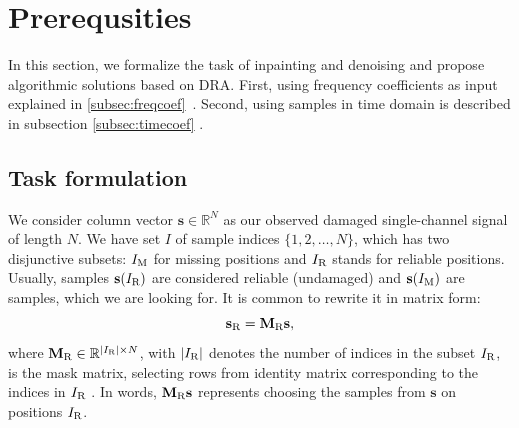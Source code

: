 \documentclass[conference]{IEEEtran}
\newcommand{\todo}[1]{\textcolor{red}{#1}}
\begin{document}
\section{Prerequsities}\label{sec:prereq} 


In this section, we formalize the task of inpainting and denoising and propose algorithmic solutions based on DRA.
First, using frequency coefficients as input explained in \ref{subsec:freqcoef}~\cite{Mokry2020}.
Second, using samples in time domain is described in subsection \ref{subsec:timecoef} \cite{Mokry2021}.


\subsection{Task formulation}

We consider column vector $ \mathbf{s} \in \mathbb{R}^{N} $ as our observed damaged single-channel signal of length $ N $.
We have set $ I $ of sample indices $ \{1,2,\dots,N\} $, which has two disjunctive subsets: $I_\textup{M} $ for missing positions and $ I_\textup{R} $ stands for reliable positions.
Usually, samples $ \mathbf{s}(I_\textup{R}) $ are considered reliable (undamaged) and $ \mathbf{s}(I_\textup{M}) $ are samples, which we are looking for.
It is common to rewrite it in matrix form:
\begin{equation*}
	\mathbf{s}_{\textup{R}} = \mathbf{M}_{\textup{R}}\mathbf{s},
\end{equation*}
where $\mathbf{M}_\textup{R} \in \mathbb{R} ^ { |I_\textup{R}| \times N}$, with $ |I_\textup{R}|$ denotes the number of indices in the subset $I_\textup{R}$, is the mask matrix, selecting rows from identity matrix corresponding to the indices in $I_\textup{R}$ \cite{Adler2012}.
In words, $\mathbf{M}_{\textup{R}}\mathbf{s}$ represents choosing the samples from $\mathbf{s}$ on positions $I_\textup{R}$.
\end{document}
